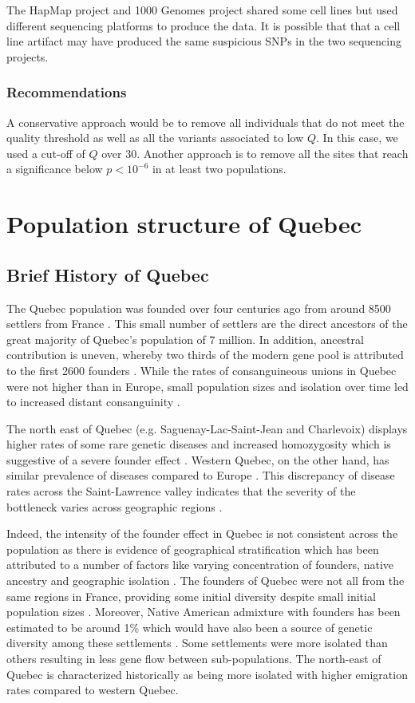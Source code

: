 \documentclass[
11pt, %
oneside, %
english, %
doublespacing, %
headsepline, %
chapterinoneline, %
]{MastersDoctoralThesis} %
\begin{document}
The HapMap project and 1000 Genomes project shared some cell lines but used different sequencing platforms to produce the data.
It is possible that that a cell line artifact may have produced the same suspicious SNPs in the two sequencing projects.

\subsection{Recommendations}
A conservative approach would be to remove all individuals that do not meet the quality threshold as well as all the variants associated to low $Q$.
In this case, we used a cut-off of $Q$ over 30.
Another approach is to remove all the sites that reach a significance below $ p < 10^{-6}$ in at least two populations.
\vfill
\chapter{Population structure of Quebec}

\section{Brief History of Quebec}
The Quebec population was founded over four centuries ago from around 8500 settlers from France \citep{Bherer2011,Laberge2005}.
This small number of settlers are the direct ancestors of the great majority of Quebec's population of 7 million.
In addition, ancestral contribution is uneven, whereby two thirds of the modern gene pool is attributed to the first 2600 founders \citep{Gagnon2001, Laberge2005}.
While the rates of consanguineous unions in Quebec were not higher than in Europe, small population sizes and isolation over time led to increased distant consanguinity \citep{Laberge2005}.

The north east of Quebec (e.g. Saguenay-Lac-Saint-Jean and Charlevoix) displays higher rates of some rare genetic diseases and increased homozygosity which is suggestive of a severe founder effect \citep{Gagnon2001}.
Western Quebec, on the other hand, has similar prevalence of diseases compared to Europe \citep{Gagnon2001}.
This discrepancy of disease rates across the Saint-Lawrence valley indicates that the severity of the bottleneck varies across geographic regions \citep{Gagnon2001}.

Indeed, the intensity of the founder effect in Quebec is not consistent across the population as there is evidence of geographical stratification which has been attributed to a number of factors like varying concentration of founders, native ancestry and geographic isolation \citep{Gagnon2001,Laberge2005,Bherer2011}.
The founders of Quebec were not all from the same regions in France, providing some initial diversity despite small initial population sizes \citep{Laberge2005}.
Moreover, Native American admixture with founders has been estimated to be around 1\% which would have also been a source of genetic diversity among these settlements \citep{Moreau2013}.
Some settlements were more isolated than others resulting in less gene flow between sub-populations.
The north-east of Quebec is characterized historically as being more isolated with higher emigration rates compared to western Quebec.
\end{document}
